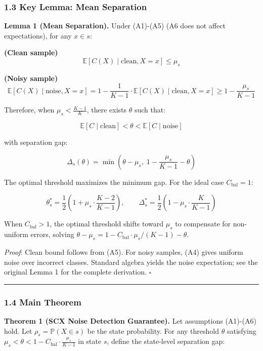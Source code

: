 \documentclass[
  12pt,
]{ctexart}
\begin{document}
\subsubsection{1.3 Key Lemma: Mean
Separation}\label{key-lemma-mean-separation}

\textbf{Lemma 1 (Mean Separation).} Under (A1)-(A5) (A6 does not affect
expectations), for any \(x \in s\):

\textbf{(Clean sample)}
\[\mathbb{E}[C(X) \mid \text{clean}, X = x] \leq \mu_s\]

\textbf{(Noisy sample)}
\[\mathbb{E}[C(X) \mid \text{noise}, X = x] = 1 - \frac{1}{K-1} \cdot \mathbb{E}[C(X) \mid \text{clean}, X = x] \geq 1 - \frac{\mu_s}{K-1}\]

Therefore, when \(\mu_s < \frac{K-1}{K}\), there exists \(\theta\) such
that:

\[\mathbb{E}[C \mid \text{clean}] < \theta < \mathbb{E}[C \mid \text{noise}]\]

with separation gap:

\[\Delta_s(\theta) = \min\left(\theta - \mu_s, \; 1 - \frac{\mu_s}{K-1} - \theta\right)\]

The optimal threshold maximizes the minimum gap. For the ideal case
\(C_{\text{bal}} = 1\):

\[\theta_s^* = \frac{1}{2}\left(1 + \mu_s \cdot \frac{K-2}{K-1}\right), \qquad
\Delta_s^* = \frac{1}{2}\left(1 - \mu_s \cdot \frac{K}{K-1}\right)\]

When \(C_{\text{bal}} > 1\), the optimal threshold shifts toward
\(\mu_s\) to compensate for non-uniform errors, solving
\(\theta - \mu_s = 1 - C_{\text{bal}} \cdot \mu_s/(K-1) - \theta\).

\emph{Proof}: Clean bound follows from (A5). For noisy samples, (A4)
gives uniform noise over incorrect classes. Standard algebra yields the
noise expectation; see the original Lemma 1 for the complete derivation.
\(\square\)

\begin{center}\rule{0.5\linewidth}{0.5pt}\end{center}

\subsubsection{1.4 Main Theorem}\label{main-theorem}

\textbf{Theorem 1 (SCX Noise Detection Guarantee).} Let assumptions
(A1)-(A6) hold. Let \(\rho_s = \mathbb{P}(X \in s)\) be the state
probability. For any threshold \(\theta\) satisfying
\(\mu_s < \theta < 1 - C_{\text{bal}} \cdot \frac{\mu_s}{K-1}\) in state
\(s\), define the state-level separation gap:
\end{document}

